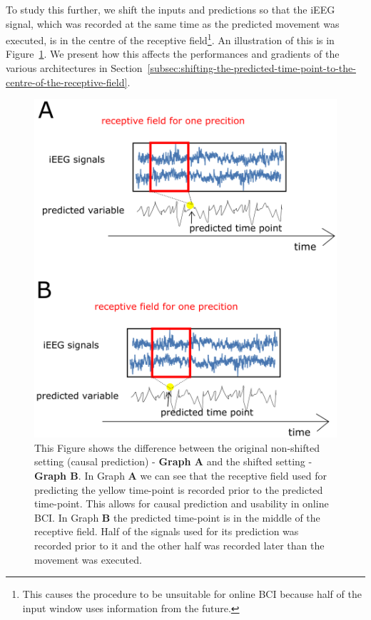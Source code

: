 To study this further, we shift the inputs and predictions so that the iEEG signal, which was recorded at the same time as the predicted movement was executed, is in the centre of the receptive field\footnote{This causes the procedure to be unsuitable for online BCI because half of the input window uses information from the future.}. An illustration of this is in Figure~\ref{fig:image-of-shifting}. 
We present how this affects the performances and gradients of the various architectures in Section~\ref{subsec:shifting-the-predicted-time-point-to-the-centre-of-the-receptive-field}.

\begin{figure}[!htbp]
\centering
   \includegraphics[width=0.8\linewidth]{img/ch4/shifted-vs-non-shifted-image.png}
   \caption[Shifted vs. non-shifted setting - scheme]{This Figure shows the difference between the original non-shifted setting (causal prediction) - \textbf{Graph A} and the shifted setting - \textbf{Graph B}. In Graph \textbf{A} we can see that the receptive field used for predicting the yellow time-point is recorded prior to the predicted time-point. This allows for causal prediction and usability in online BCI. In Graph \textbf{B} the predicted time-point is in the middle of the receptive field. Half of the signals used for its prediction was recorded prior to it and the other half was recorded later than the movement was executed.}
   \label{fig:image-of-shifting}
\end{figure}

